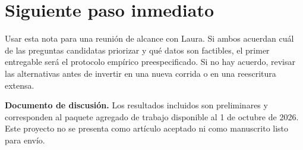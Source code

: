 \documentclass[11pt]{article}
\begin{document}
\section{Siguiente paso inmediato}

Usar esta nota para una reunión de alcance con Laura. Si ambos acuerdan
cuál de las preguntas candidatas priorizar y qué datos son factibles, el
primer entregable será el protocolo empírico preespecificado. Si no hay
acuerdo, revisar las alternativas antes de invertir en una nueva corrida o
en una reescritura extensa.

\vfill
\noindent\textbf{Documento de discusión.} Los resultados incluidos son
preliminares y corresponden al paquete agregado de trabajo disponible al
1 de octubre de 2026. Este proyecto no se presenta como artículo aceptado ni
como manuscrito listo para envío.
\end{document}
